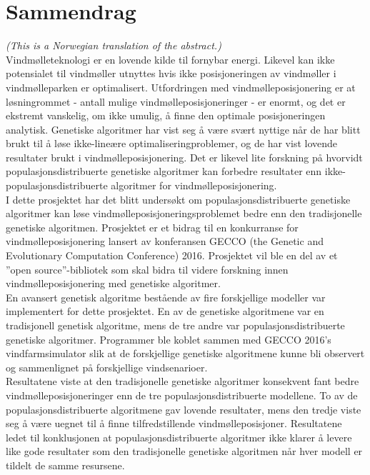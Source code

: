 \section*{Sammendrag}

\noindent \textit{(This is a Norwegian translation of the abstract.)}\\

\noindent Vindmølleteknologi er en lovende kilde til fornybar energi. Likevel kan ikke potensialet til vindmøller utnyttes hvis ikke posisjoneringen av vindmøller i vindmølleparken er optimalisert. Utfordringen med vindmølleposisjonering er at løsningrommet - antall mulige vindmølleposisjoneringer - er enormt, og det er ekstremt vanskelig, om ikke umulig, å finne den optimale posisjoneringen analytisk. Genetiske algoritmer har vist seg å være svært nyttige når de har blitt brukt til å løse ikke-lineære optimaliseringproblemer, og de har vist lovende resultater brukt i vindmølleposisjonering. Det er likevel lite forskning på hvorvidt populasjonsdistribuerte genetiske algoritmer kan forbedre resultater enn ikke-populasjonsdistribuerte algoritmer for vindmølleposisjonering. \\

\noindent I dette prosjektet har det blitt undersøkt om populasjonsdistribuerte genetiske algoritmer kan løse vindmølleposisjoneringsproblemet bedre enn den tradisjonelle genetiske algoritmen. Prosjektet er et bidrag til en konkurranse for vindmølleposisjonering lansert av konferansen GECCO (the Genetic and Evolutionary Computation Conference) 2016. Prosjektet vil ble en del av et ''open source''-bibliotek som skal bidra til videre forskning innen vindmølleposisjonering med genetiske algoritmer.\\
    
\noindent En avansert genetisk algoritme bestående av fire forskjellige modeller var implementert for dette prosjektet. En av de genetiske algoritmene var en tradisjonell genetisk algoritme, mens de tre andre var populasjonsdistribuerte genetiske algoritmer. Programmer ble koblet sammen med GECCO 2016's vindfarmsimulator slik at de forskjellige genetiske algoritmene kunne bli observert og sammenlignet på forskjellige vindsenarioer.\\
    
\noindent Resultatene viste at den tradisjonelle genetiske algoritmer konsekvent fant bedre vindmølleposisjoneringer enn de tre populasjonsdistribuerte modellene. To av de populasjonsdistribuerte algoritmene gav lovende resultater, mens den tredje viste seg å være uegnet til å finne tilfredstillende vindmølleposisjoner. Resultatene ledet til konklusjonen at populasjonsdistribuerte algoritmer ikke klarer å levere like gode resultater som den tradisjonelle genetiske algoritmen når hver modell er tildelt de samme resursene.\\